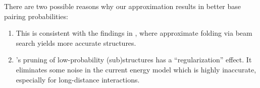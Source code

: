 \begin{enumerate}
 \end{enumerate}

\vspace{-0.2cm}
There are two possible reasons why our approximation 
results in better base pairing probabilities: 
\begin{enumerate}
  \vspace{-0.2cm}
  \setlength{\itemsep}{0pt}%
 
\item
  This is consistent with the findings in \linearfold, where
  approximate folding via beam search yields more accurate structures.



\item
\linearpartition's pruning of low-probability (sub)structures
has a ``regularization'' effect.
It eliminates some noise in the current energy model 
which is highly inaccurate, especially for long-distance interactions.
\end{enumerate}

